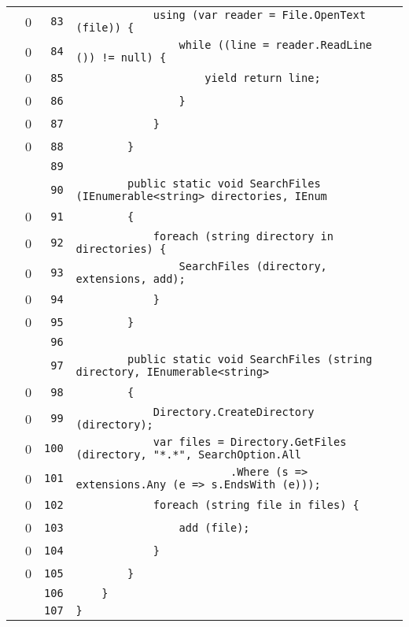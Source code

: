 \documentclass[a4paper,10pt]{article}
\begin{document}
\begin{longtable}[l]{lrrl}
\cellcolor{red} & 0 & \verb~83~ & \verb~            using (var reader = File.OpenText (file)) {~\\
\cellcolor{red} & 0 & \verb~84~ & \verb~                while ((line = reader.ReadLine ()) != null) {~\\
\cellcolor{red} & 0 & \verb~85~ & \verb~                    yield return line;~\\
\cellcolor{red} & 0 & \verb~86~ & \verb~                }~\\
\cellcolor{red} & 0 & \verb~87~ & \verb~            }~\\
\cellcolor{red} & 0 & \verb~88~ & \verb~        }~\\
\cellcolor{gray} &  & \verb~89~ & \verb~~\\
\cellcolor{gray} &  & \verb~90~ & \verb~        public static void SearchFiles (IEnumerable<string> directories, IEnum~\\
\cellcolor{red} & 0 & \verb~91~ & \verb~        {~\\
\cellcolor{red} & 0 & \verb~92~ & \verb~            foreach (string directory in directories) {~\\
\cellcolor{red} & 0 & \verb~93~ & \verb~                SearchFiles (directory, extensions, add);~\\
\cellcolor{red} & 0 & \verb~94~ & \verb~            }~\\
\cellcolor{red} & 0 & \verb~95~ & \verb~        }~\\
\cellcolor{gray} &  & \verb~96~ & \verb~~\\
\cellcolor{gray} &  & \verb~97~ & \verb~        public static void SearchFiles (string directory, IEnumerable<string> ~\\
\cellcolor{red} & 0 & \verb~98~ & \verb~        {~\\
\cellcolor{red} & 0 & \verb~99~ & \verb~            Directory.CreateDirectory (directory);~\\
\cellcolor{red} & 0 & \verb~100~ & \verb~            var files = Directory.GetFiles (directory, "*.*", SearchOption.All~\\
\cellcolor{red} & 0 & \verb~101~ & \verb~                        .Where (s => extensions.Any (e => s.EndsWith (e)));~\\
\cellcolor{red} & 0 & \verb~102~ & \verb~            foreach (string file in files) {~\\
\cellcolor{red} & 0 & \verb~103~ & \verb~                add (file);~\\
\cellcolor{red} & 0 & \verb~104~ & \verb~            }~\\
\cellcolor{red} & 0 & \verb~105~ & \verb~        }~\\
\cellcolor{gray} &  & \verb~106~ & \verb~    }~\\
\cellcolor{gray} &  & \verb~107~ & \verb~}~\\
\end{longtable}
\newpage
\end{document}
